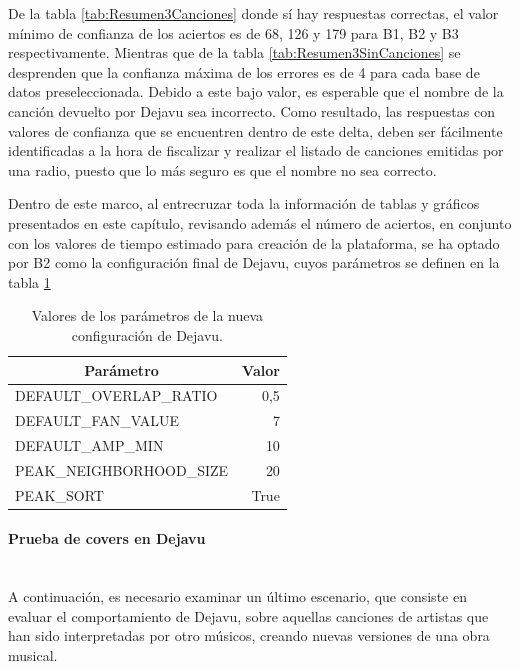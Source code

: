 De la tabla \ref{tab:Resumen3Canciones} donde sí hay respuestas correctas, el valor mínimo de confianza de los aciertos es de 68, 126 y 179 para B1, B2 y B3 respectivamente. Mientras que de la tabla \ref{tab:Resumen3SinCanciones} se desprenden que la confianza máxima de los errores es de 4 para cada base de datos preseleccionada. Debido a este bajo valor, es esperable que el nombre de la canción devuelto por Dejavu sea incorrecto. Como resultado, las respuestas con valores de confianza que se encuentren dentro de este delta, deben ser fácilmente identificadas a la hora de fiscalizar y realizar el listado de canciones emitidas por una radio, puesto que lo más seguro es que el nombre no sea correcto. 

Dentro de este marco, al entrecruzar toda la información de tablas y gráficos presentados en este capítulo, revisando además el número de aciertos, en conjunto con los valores de tiempo estimado para creación de la plataforma, se ha optado por B2 como la configuración final de Dejavu, cuyos parámetros se definen en la tabla \ref{tab:NuevaConfiguracionBDD}


\FloatBarrier
\begin{table}[h!]
\centering
\caption{Valores de los parámetros de la nueva configuración de Dejavu.}
\label{tab:NuevaConfiguracionBDD}
\begin{tabular}{@{}lr@{}}
\toprule
\midrule
\multicolumn{1}{c}{Parámetro} & \multicolumn{1}{c}{Valor}  \\ \midrule
DEFAULT\_OVERLAP\_RATIO   & 0,5                       \\
DEFAULT\_FAN\_VALUE       & 7                        \\
DEFAULT\_AMP\_MIN         & 10                        \\
PEAK\_NEIGHBORHOOD\_SIZE  & 20                        \\
PEAK\_SORT                & True                      \\ \midrule \bottomrule
\end{tabular}
\end{table}



\paragraph{Prueba de covers en Dejavu}\label{parrrafoPruebasCovers}\mbox{}\\

A continuación, es necesario examinar un último escenario, que consiste en evaluar el comportamiento de Dejavu, sobre aquellas canciones de artistas que han sido interpretadas por otro músicos, creando nuevas versiones de una obra musical.


